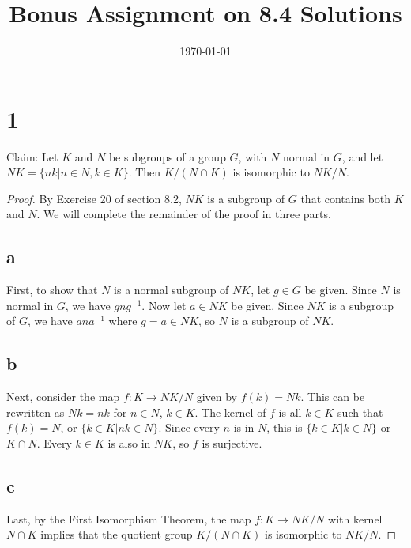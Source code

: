 \documentclass{article}
\title{\textbf{Bonus Assignment on 8.4 Solutions}}
\date{}
\date\today
\begin{document}
\maketitle %

\thispagestyle{firstpage}
\section*{1}

Claim: Let $K$ and $N$ be subgroups of a group $G$, with $N$ normal in $G$, and let $NK = \{ nk | n \in N, k \in K \}$.  
Then $K/(N \cap K)$ is isomorphic to $NK/N$.  

\begin{proof}
    By Exercise 20 of section 8.2, $NK$ is a subgroup of $G$ that contains both $K$ and $N$.  
    We will complete the remainder of the proof in three parts. 
    \subsection*{a}
    First, to show that $N$ is a normal subgroup of $NK$, let $g \in G$ be given.  Since 
    $N$ is normal in $G$, we have $gng^{-1}$.  Now let $a \in NK$ be given.  Since $NK$ is a 
    subgroup of $G$, we have $ana^{-1}$ where $g = a \in NK$, so $N$ is a subgroup of $NK$.

    \subsection*{b}
    Next, consider the map $f:K \rightarrow NK/N$ given by $f(k) = Nk$.  This can be rewritten as 
    $Nk = nk$ for $n \in N$, $k \in K$.  The kernel of $f$ is all $k \in K$ such that 
    $f(k) = N$, or $\{ k \in K | nk \in N \}$.  Since every $n$ is in $N$, this is 
    $\{ k \in K | k \in N \}$ or $K \cap N$.  Every $k \in K$ is also in $NK$, so $f$ is 
    surjective.

    \subsection*{c}
    Last, by the First Isomorphism Theorem, the map $f: K \rightarrow NK/N$ with kernel $N \cap K$ 
    implies that the quotient group $K/(N \cap K)$ is isomorphic to $NK/N$.
\end{proof}
\end{document}
